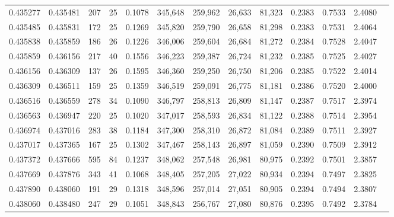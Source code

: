 \begin{tabular}{rrrrrrrrrrrrr}
0.435277 & 0.435481 &   207 &  25 &                                     0.1078 & 345,648 & 259,962 &  26,633 &  81,323 & 0.2383 & 0.7533 & 2.4080 \\
0.435485 & 0.435831 &   172 &  25 &                                     0.1269 & 345,820 & 259,790 &  26,658 &  81,298 & 0.2383 & 0.7531 & 2.4064 \\
0.435838 & 0.435859 &   186 &  26 &                                     0.1226 & 346,006 & 259,604 &  26,684 &  81,272 & 0.2384 & 0.7528 & 2.4047 \\
0.435859 & 0.436156 &   217 &  40 &                                     0.1556 & 346,223 & 259,387 &  26,724 &  81,232 & 0.2385 & 0.7525 & 2.4027 \\
0.436156 & 0.436309 &   137 &  26 &                                     0.1595 & 346,360 & 259,250 &  26,750 &  81,206 & 0.2385 & 0.7522 & 2.4014 \\
0.436309 & 0.436511 &   159 &  25 &                                     0.1359 & 346,519 & 259,091 &  26,775 &  81,181 & 0.2386 & 0.7520 & 2.4000 \\
0.436516 & 0.436559 &   278 &  34 &                                     0.1090 & 346,797 & 258,813 &  26,809 &  81,147 & 0.2387 & 0.7517 & 2.3974 \\
0.436563 & 0.436947 &   220 &  25 &                                     0.1020 & 347,017 & 258,593 &  26,834 &  81,122 & 0.2388 & 0.7514 & 2.3954 \\
0.436974 & 0.437016 &   283 &  38 &                                     0.1184 & 347,300 & 258,310 &  26,872 &  81,084 & 0.2389 & 0.7511 & 2.3927 \\
0.437017 & 0.437365 &   167 &  25 &                                     0.1302 & 347,467 & 258,143 &  26,897 &  81,059 & 0.2390 & 0.7509 & 2.3912 \\
0.437372 & 0.437666 &   595 &  84 &                                     0.1237 & 348,062 & 257,548 &  26,981 &  80,975 & 0.2392 & 0.7501 & 2.3857 \\
0.437669 & 0.437876 &   343 &  41 &                                     0.1068 & 348,405 & 257,205 &  27,022 &  80,934 & 0.2394 & 0.7497 & 2.3825 \\
0.437890 & 0.438060 &   191 &  29 &                                     0.1318 & 348,596 & 257,014 &  27,051 &  80,905 & 0.2394 & 0.7494 & 2.3807 \\
0.438060 & 0.438480 &   247 &  29 &                                     0.1051 & 348,843 & 256,767 &  27,080 &  80,876 & 0.2395 & 0.7492 & 2.3784 \\

\end{tabular}
